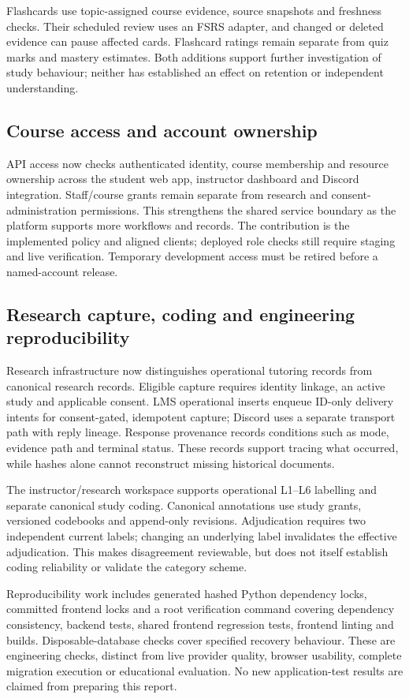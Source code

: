 \documentclass[11pt,a4paper]{article}
\begin{document}
Flashcards use topic-assigned course evidence, source snapshots and freshness checks. Their scheduled review uses an FSRS adapter, and changed or deleted evidence can pause affected cards. Flashcard ratings remain separate from quiz marks and mastery estimates. Both additions support further investigation of study behaviour; neither has established an effect on retention or independent understanding.

\subsection{Course access and account ownership}
API access now checks authenticated identity, course membership and resource ownership across the student web app, instructor dashboard and Discord integration. Staff/course grants remain separate from research and consent-administration permissions. This strengthens the shared service boundary as the platform supports more workflows and records. The contribution is the implemented policy and aligned clients; deployed role checks still require staging and live verification. Temporary development access must be retired before a named-account release.

\subsection{Research capture, coding and engineering reproducibility}
Research infrastructure now distinguishes operational tutoring records from canonical research records. Eligible capture requires identity linkage, an active study and applicable consent. LMS operational inserts enqueue ID-only delivery intents for consent-gated, idempotent capture; Discord uses a separate transport path with reply lineage. Response provenance records conditions such as mode, evidence path and terminal status. These records support tracing what occurred, while hashes alone cannot reconstruct missing historical documents.

The instructor/research workspace supports operational L1--L6 labelling and separate canonical study coding. Canonical annotations use study grants, versioned codebooks and append-only revisions. Adjudication requires two independent current labels; changing an underlying label invalidates the effective adjudication. This makes disagreement reviewable, but does not itself establish coding reliability or validate the category scheme.

Reproducibility work includes generated hashed Python dependency locks, committed frontend locks and a root verification command covering dependency consistency, backend tests, shared frontend regression tests, frontend linting and builds. Disposable-database checks cover specified recovery behaviour. These are engineering checks, distinct from live provider quality, browser usability, complete migration execution or educational evaluation. No new application-test results are claimed from preparing this report.
\end{document}
